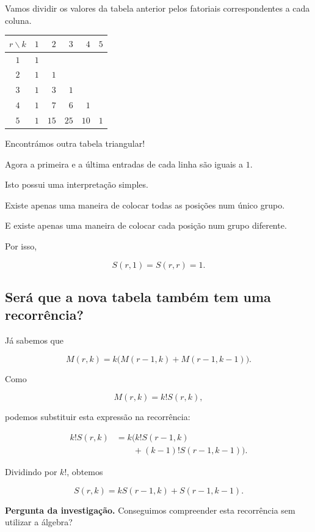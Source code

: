 \documentclass[11pt,a4paper,oneside]{book}
\newcommand{\Pergunta}[1]{\begin{perguntabox}\textbf{Pergunta da investigação.} #1\end{perguntabox}}
\renewcommand\arraystretch{1.18}
\begin{document}
Vamos dividir os valores da tabela
anterior pelos fatoriais
correspondentes a cada coluna.

\begin{center}
\renewcommand{\arraystretch}{1.45}
\begin{tabular}{c|rrrrr}
\hline
$r\backslash k$
& $1$ & $2$ & $3$ & $4$ & $5$\\
\hline
$1$ & $1$ & & & &\\
$2$ & $1$ & $1$ & & &\\
$3$ & $1$ & $3$ & $1$ & &\\
$4$ & $1$ & $7$ & $6$ & $1$ &\\
$5$ & $1$ & $15$ & $25$ & $10$ & $1$\\
\hline
\end{tabular}
\end{center}

Encontrámos outra tabela triangular!

Agora a primeira e a última
entradas de cada linha são iguais a $1$.

Isto possui uma interpretação simples.

Existe apenas uma maneira
de colocar todas as posições
num único grupo.

E existe apenas uma maneira
de colocar cada posição
num grupo diferente.

Por isso,

\[
S(r,1)=S(r,r)=1.
\]

\subsection*{Será que a nova tabela também tem uma recorrência?}

Já sabemos que

\[
M(r,k)=k\bigl(M(r-1,k)+M(r-1,k-1)\bigr).
\]

Como

\[
M(r,k)=k!S(r,k),
\]

podemos substituir esta expressão
na recorrência:

\[
\begin{aligned}
k!S(r,k)
&=k\bigl(k!S(r-1,k)\\
&\qquad +(k-1)!S(r-1,k-1)\bigr).
\end{aligned}
\]

Dividindo por $k!$, obtemos

\[
\boxed{
S(r,k)=
kS(r-1,k)+S(r-1,k-1)
}.
\]

\Pergunta{Conseguimos compreender esta
recorrência sem utilizar a álgebra?}
\end{document}
